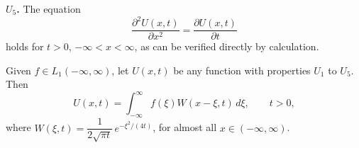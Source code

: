 \noindent\textbf{$U_5$.} The equation
\begin{equation*}
\frac{\partial^{2}U(x,t)}{\partial x^{2}}=\frac{\partial U(x,t)}{\partial t}
\end{equation*}
holds for $t>0$, $-\infty<x<\infty$, as can be verified directly by calculation.

\begin{theorem}\label{thm:I-27}
Given $f\in L_1(-\infty,\infty)$, let $U(x,t)$ be any function with properties $U_1$ to $U_5$. Then
\begin{equation*}
U(x,t)=\int_{-\infty}^{\infty}f(\xi)W(x-\xi,t)\,d\xi,\qquad t>0,
\end{equation*}
where $W(\xi,t)=\dfrac{1}{2\sqrt{\pi t}}\,e^{-\xi^{2}/(4t)}$, for almost all $x\in(-\infty,\infty)$.
\end{theorem}

